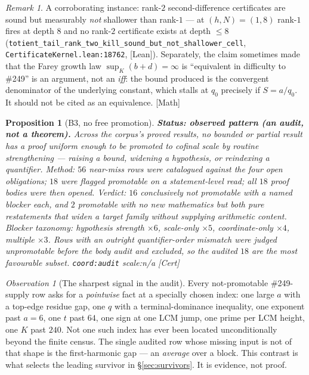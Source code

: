 \documentclass[11pt]{article}
\theoremstyle{plain}
\newtheorem{prop}[thm]{Proposition}
\theoremstyle{definition}
\theoremstyle{remark}
\newtheorem{rem}[thm]{Remark}
\newtheorem{obs}[thm]{Observation}
\newcommand{\ev}[1]{{\small\textsf{[#1]}}\xspace}
\newcommand{\scale}[1]{{\small\textsf{scale:#1}}\xspace}
\newcommand{\coord}[1]{\texorpdfstring{{\small\nolinkurl{coord:#1}}}{coord:#1}\xspace}
\begin{document}
\begin{rem}
A corroborating instance: rank-$2$ second-difference certificates are sound but
measurably \emph{not} shallower than rank-$1$ --- at $(h,N) = (1,8)$ rank-$1$
fires at depth $8$ and no rank-$2$ certificate exists at depth $\le 8$
(\texttt{totient\_tail\_rank\_two\_kill\_sound\_but\_not\_shallower\_cell},
\texttt{CertificateKernel.lean:18762}, \ev{Lean}). Separately, the claim
sometimes made that the Farey growth law $\sup_K(b+d) = \infty$ is ``equivalent
in difficulty to \#249'' is an argument, not an \emph{iff}: the bound produced
is the convergent denominator of the underlying constant, which stalls at $q_0$
precisely if $S = a/q_0$. It should not be cited as an equivalence. \ev{Math}
\end{rem}

\begin{prop}[B3, no free promotion]
\label{prop:b3}
\textbf{Status: observed pattern (an audit, not a theorem).} Across the
corpus's proved results, no bounded or partial result has a proof uniform
enough to be promoted to cofinal scale by routine strengthening --- raising a
bound, widening a hypothesis, or reindexing a quantifier. Method: $56$
near-miss rows were catalogued against the four open obligations; $18$ were
flagged promotable on a statement-level read; all $18$ proof \emph{bodies} were
then opened. Verdict: $16$ conclusively not promotable with a named blocker
each, and $2$ promotable with no new mathematics but both pure restatements
that widen a target family without supplying arithmetic content. Blocker
taxonomy: hypothesis strength $\times 6$, scale-only $\times 5$,
coordinate-only $\times 4$, multiple $\times 3$. Rows with an outright
quantifier-order mismatch were judged unpromotable before the body audit and
excluded, so the audited $18$ are the \emph{most favourable} subset.
\coord{audit} \scale{n/a} \ev{Cert}
\end{prop}

\begin{obs}[The sharpest signal in the audit]
\label{obs:pointwise}
Every not-promotable \#249-supply row asks for a \emph{pointwise} fact at a
specially chosen index: one large $a$ with a top-edge residue gap, one $q$ with
a terminal-dominance inequality, one exponent past $a = 6$, one $t$ past $64$,
one sign at one LCM jump, one prime per LCM height, one $K$ past $240$. Not one
such index has ever been located unconditionally beyond the finite census. The
single audited row whose missing input is not of that shape is the
first-harmonic gap --- an \emph{average} over a block. This contrast is what
selects the leading survivor in \S\ref{sec:survivors}. It is evidence, not
proof.
\end{obs}
\end{document}
